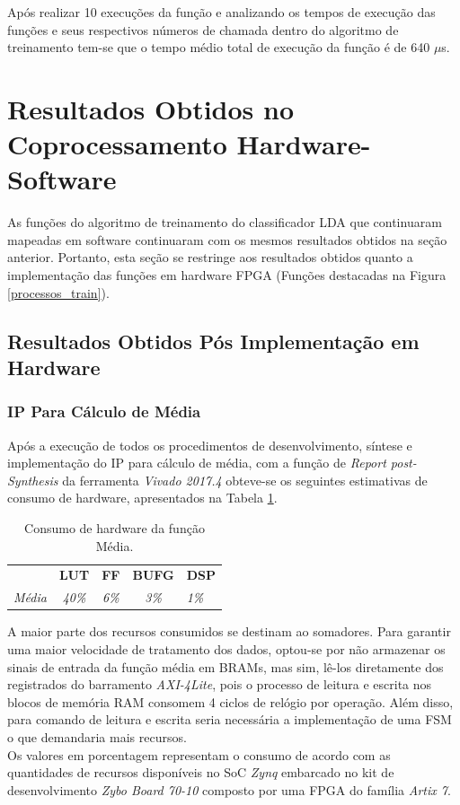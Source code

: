 Após realizar 10 execuções da função e analizando os tempos de execução das funções e seus respectivos números de chamada dentro do algoritmo de treinamento tem-se que o tempo médio total de execução da função é de 640 $\mu$s.

\section{Resultados Obtidos no Coprocessamento Hardware-Software}
As funções do algoritmo de treinamento do classificador LDA que continuaram mapeadas em software continuaram com os mesmos resultados obtidos na seção anterior. Portanto, esta seção se restringe aos resultados obtidos quanto a implementação das funções em hardware FPGA (Funções destacadas na Figura \ref{processos_train}).

\subsection{Resultados Obtidos Pós Implementação em Hardware}
\subsubsection{IP Para Cálculo de Média}

Após a execução de todos os procedimentos de desenvolvimento, síntese e implementação do IP para cálculo de média, com a função de \textit{Report post-Synthesis} da ferramenta \textit{Vivado 2017.4} obteve-se os seguintes estimativas de consumo de hardware, apresentados na Tabela \ref{consumo_media}.

\begin{table}[!h]
	\centering
	\caption{Consumo de hardware da função Média.}
	\label{consumo_media}
	\begin{tabular}{ccccl}
		\textbf{}         & \textbf{LUT}  & \textbf{FF}  & \textbf{BUFG} & \textbf{DSP} \\
		\textit{Média} & \textit{40\%} & \textit{6\%} & \textit{3\%}  & \textit{1\%}
	\end{tabular}
\end{table}

A maior parte dos recursos consumidos se destinam ao somadores. Para garantir uma maior velocidade de tratamento dos dados, optou-se por não armazenar os sinais de entrada da função média em BRAMs, mas sim, lê-los diretamente dos registrados do barramento \textit{AXI-4Lite}, pois o processo de leitura e escrita nos blocos de memória RAM consomem 4 ciclos de relógio por operação. Além disso, para comando de leitura e escrita seria necessária a implementação de uma FSM o que demandaria mais recursos.\\
Os valores em porcentagem representam o consumo de acordo com as quantidades de recursos disponíveis no SoC \textit{Zynq} embarcado no kit de desenvolvimento \textit{Zybo Board 70-10} composto por uma FPGA do família \textit{Artix 7}.

